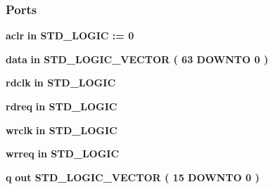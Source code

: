 \subsubsection*{Ports}
 \begin{DoxyCompactItemize}
\item 
{\bf aclr}  {\bfseries {\bfseries \textcolor{keywordflow}{in}\textcolor{vhdlchar}{ }}} {\bfseries \textcolor{comment}{S\+T\+D\+\_\+\+L\+O\+G\+IC}\textcolor{vhdlchar}{ }\textcolor{vhdlchar}{ }\textcolor{vhdlchar}{\+:}\textcolor{vhdlchar}{=}\textcolor{vhdlchar}{ }\textcolor{vhdlchar}{ }\textcolor{vhdlchar}{\textquotesingle{}}\textcolor{vhdlchar}{ } \textcolor{vhdldigit}{0} \textcolor{vhdlchar}{ }\textcolor{vhdlchar}{\textquotesingle{}}\textcolor{vhdlchar}{ }} 
\item 
{\bf data}  {\bfseries {\bfseries \textcolor{keywordflow}{in}\textcolor{vhdlchar}{ }}} {\bfseries \textcolor{comment}{S\+T\+D\+\_\+\+L\+O\+G\+I\+C\+\_\+\+V\+E\+C\+T\+OR}\textcolor{vhdlchar}{ }\textcolor{vhdlchar}{(}\textcolor{vhdlchar}{ }\textcolor{vhdlchar}{ } \textcolor{vhdldigit}{63} \textcolor{vhdlchar}{ }\textcolor{keywordflow}{D\+O\+W\+N\+TO}\textcolor{vhdlchar}{ }\textcolor{vhdlchar}{ } \textcolor{vhdldigit}{0} \textcolor{vhdlchar}{ }\textcolor{vhdlchar}{)}\textcolor{vhdlchar}{ }} 
\item 
{\bf rdclk}  {\bfseries {\bfseries \textcolor{keywordflow}{in}\textcolor{vhdlchar}{ }}} {\bfseries \textcolor{comment}{S\+T\+D\+\_\+\+L\+O\+G\+IC}\textcolor{vhdlchar}{ }} 
\item 
{\bf rdreq}  {\bfseries {\bfseries \textcolor{keywordflow}{in}\textcolor{vhdlchar}{ }}} {\bfseries \textcolor{comment}{S\+T\+D\+\_\+\+L\+O\+G\+IC}\textcolor{vhdlchar}{ }} 
\item 
{\bf wrclk}  {\bfseries {\bfseries \textcolor{keywordflow}{in}\textcolor{vhdlchar}{ }}} {\bfseries \textcolor{comment}{S\+T\+D\+\_\+\+L\+O\+G\+IC}\textcolor{vhdlchar}{ }} 
\item 
{\bf wrreq}  {\bfseries {\bfseries \textcolor{keywordflow}{in}\textcolor{vhdlchar}{ }}} {\bfseries \textcolor{comment}{S\+T\+D\+\_\+\+L\+O\+G\+IC}\textcolor{vhdlchar}{ }} 
\item 
{\bf q}  {\bfseries {\bfseries \textcolor{keywordflow}{out}\textcolor{vhdlchar}{ }}} {\bfseries \textcolor{comment}{S\+T\+D\+\_\+\+L\+O\+G\+I\+C\+\_\+\+V\+E\+C\+T\+OR}\textcolor{vhdlchar}{ }\textcolor{vhdlchar}{(}\textcolor{vhdlchar}{ }\textcolor{vhdlchar}{ } \textcolor{vhdldigit}{15} \textcolor{vhdlchar}{ }\textcolor{keywordflow}{D\+O\+W\+N\+TO}\textcolor{vhdlchar}{ }\textcolor{vhdlchar}{ } \textcolor{vhdldigit}{0} \textcolor{vhdlchar}{ }\textcolor{vhdlchar}{)}\textcolor{vhdlchar}{ }} 

\end{DoxyCompactItemize}
